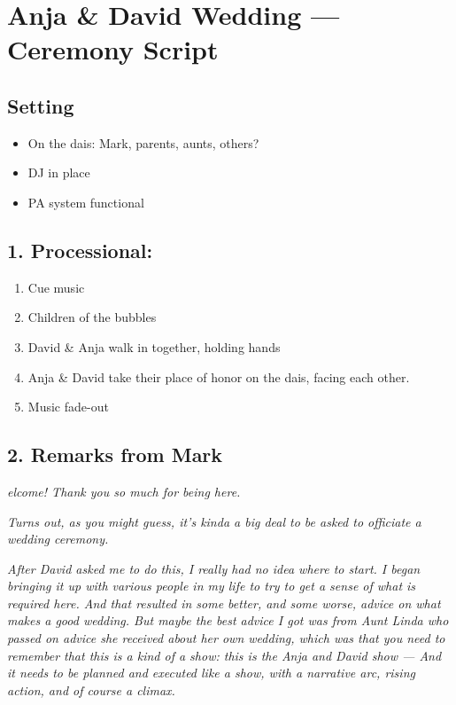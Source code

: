 \Large
\hypertarget{section}{%
\section{Anja \& David Wedding --- Ceremony Script}\label{section}}

\hypertarget{setting}{%
\subsection{Setting}\label{setting}}

\begin{itemize}
\tightlist
\item
  On the dais: Mark, parents, aunts, others?
\item
  DJ in place
\item
  PA system functional
\end{itemize}

\hypertarget{processional}{%
\subsection{1. Processional:}\label{processional}}

\begin{enumerate}
\def\labelenumi{\arabic{enumi}.}
\tightlist
\item
  Cue music
\item
  Children of the bubbles
\item
  David \& Anja walk in together, holding hands
\item
  Anja \& David take their place of honor on the dais, facing each
  other.
\item
  Music fade-out
\end{enumerate}

\hypertarget{remarks-from-mark}{%
\subsection{2. Remarks from Mark}\label{remarks-from-mark}}

\emph{elcome! Thank you so much for being here.}

\emph{Turns out, as you might guess, it's kinda a big deal to be asked
to officiate a wedding ceremony.}

\emph{After David asked me to do this, I really had no idea where to
start. I began bringing it up with various people in my life to try to
get a sense of what is required here. And that resulted in some better,
and some worse, advice on what makes a good wedding. But maybe the best
advice I got was from Aunt Linda who passed on advice she received about
her own wedding, which was that you need to remember that this is a kind
of a show: this is the Anja and David show --- And it needs to be
planned and executed like a show, with a narrative arc, rising action,
and of course a climax.}

